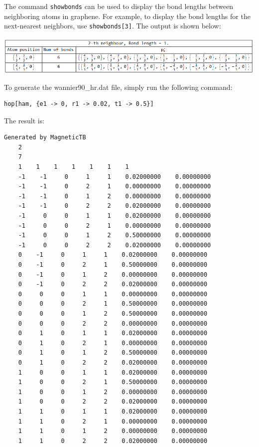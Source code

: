 \documentclass[titlepage,a4paper,12pt,AutoFakeBold]{article}
\begin{document}
The command \lstinline|showbonds| can be used to display the bond lengths between neighboring atoms in graphene. For example, to display the bond lengths for the next-nearest neighbors, use \lstinline|showbonds[3]|. The output is shown below:
\begin{center}
	\includegraphics[width=1.0\textwidth]{./figures/showbonds.png}
\end{center}

To generate the wannier90\_hr.dat file, simply run the following command:
\begin{lstlisting}[numbers=none]
	hop[ham, {e1 -> 0, r1 -> 0.02, t1 -> 0.5}]
\end{lstlisting}
The result is:
\begin{lstlisting}[numbers=none]
	Generated by MagneticTB
	2
	7
	1    1    1    1    1    1    1
	-1    -1     0     1     1    0.02000000    0.00000000
	-1    -1     0     2     1    0.00000000    0.00000000
	-1    -1     0     1     2    0.00000000    0.00000000
	-1    -1     0     2     2    0.02000000    0.00000000
	-1     0     0     1     1    0.02000000    0.00000000
	-1     0     0     2     1    0.00000000    0.00000000
	-1     0     0     1     2    0.50000000    0.00000000
	-1     0     0     2     2    0.02000000    0.00000000
	0    -1     0     1     1    0.02000000    0.00000000
	0    -1     0     2     1    0.50000000    0.00000000
	0    -1     0     1     2    0.00000000    0.00000000
	0    -1     0     2     2    0.02000000    0.00000000
	0     0     0     1     1    0.00000000    0.00000000
	0     0     0     2     1    0.50000000    0.00000000
	0     0     0     1     2    0.50000000    0.00000000
	0     0     0     2     2    0.00000000    0.00000000
	0     1     0     1     1    0.02000000    0.00000000
	0     1     0     2     1    0.00000000    0.00000000
	0     1     0     1     2    0.50000000    0.00000000
	0     1     0     2     2    0.02000000    0.00000000
	1     0     0     1     1    0.02000000    0.00000000
	1     0     0     2     1    0.50000000    0.00000000
	1     0     0     1     2    0.00000000    0.00000000
	1     0     0     2     2    0.02000000    0.00000000
	1     1     0     1     1    0.02000000    0.00000000
	1     1     0     2     1    0.00000000    0.00000000
	1     1     0     1     2    0.00000000    0.00000000
	1     1     0     2     2    0.02000000    0.00000000
\end{lstlisting}
\end{document}
